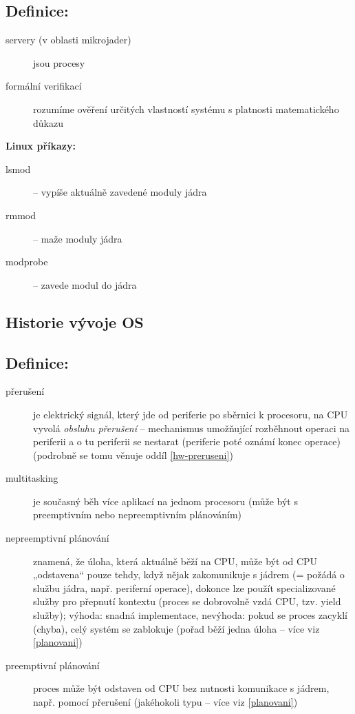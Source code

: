 \documentclass[a4paper, 11pt]{article}
\begin{document}
\newpage
\subsection*{Definice:}
\begin{description}
\item[servery (v oblasti mikrojader)] jsou procesy
\item[formální verifikací] rozumíme ověření určitých vlastností systému s platnosti matematického důkazu
\end{description}

\textbf{Linux příkazy:}
\begin{description}
\item[lsmod] -- vypíše aktuálně zavedené moduly jádra
\item[rmmod] -- maže moduly jádra
\item[modprobe] -- zavede modul do jádra
\end{description}

\subsection{Historie vývoje OS}

\subsection*{Definice:} \label{hist-preruseni} \label{ne-preemtive}
\begin{description}

\item[přerušení] je elektrický signál, který jde od periferie po sběrnici k procesoru, na CPU vyvolá \emph{obsluhu přerušení} -- mechanismus umožňující rozběhnout operaci na periferii a o tu periferii se nestarat (periferie poté oznámí konec operace) (podrobně se tomu věnuje oddíl \ref{hw-preruseni})

\item[multitasking] je současný běh více aplikací na jednom procesoru (může být s preemptivním nebo nepreemptivním plánováním)

\item[nepreemptivní plánování] znamená, že úloha, která aktuálně běží na CPU, může být od CPU „odstavena“ pouze tehdy, když nějak zakomunikuje s jádrem (= požádá o službu jádra, např. periferní operace), dokonce lze použít specializované služby pro přepnutí kontextu (proces se dobrovolně vzdá CPU, tzv. yield služby); výhoda: snadná implementace, nevýhoda: pokud se proces zacyklí (chyba), celý systém se zablokuje (pořad běží jedna úloha -- více viz \ref{planovani})

\item[preemptivní plánování] proces může být odstaven od CPU bez nutnosti komunikace s jádrem, např. pomocí přerušení (jakéhokoli typu -- více viz \ref{planovani})
\end{description}
\end{document}
